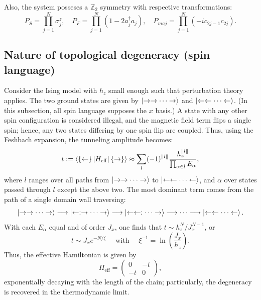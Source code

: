\documentclass{article}
\newcommand{\Heff}{H_{\mathrm{eff}}}
\begin{document}
Also, the system posseses a $\mathbb{Z}_2$ symmetry with respective transformations:
\[
    P_S = \prod_{j=1}^N \sigma_j^z,\quad
    P_F = \prod_{j=1}^N \left( 1 - 2a_j^\dagger a_j \right),\quad
    P_{maj} = \prod_{j=1}^N \left( -ic_{2j-1}c_{2j} \right).
\]

\subsection{Nature of topological degeneracy (spin language)}\label{sec:ising}
Consider the Ising model with $h_z$ small enough such that perturbation theory applies.
The two ground states are given by $\ket{\rightarrow \rightarrow \cdots \rightarrow}$
and $\ket{\leftarrow\leftarrow \cdots \leftarrow}$.
(In this subsection, all spin language supposes the $x$ basis.)
A state with any other spin configuration is considered illegal,
and the magnetic field term flips a single spin;
hence, any two states differing by one spin flip are coupled.
Thus, using the Feshbach expansion, the tunneling amplitude becomes:
\[
    t := \braket{\left\{\leftarrow\right\} | \Heff | \left\{\rightarrow\right\}}
    \approx \sum_{l} (-1)^{\lVert l \rVert} \frac{h_z^{\lVert l\rVert}}{\prod_{\alpha\in l} E_\alpha},
\]
where $l$ ranges over all paths from $\ket{\rightarrow \rightarrow \cdots \rightarrow}$
to $\ket{\leftarrow\leftarrow \cdots \leftarrow}$,
and $\alpha$ over states passed through $l$ except the above two.
The most dominant term comes from the path of a single domain wall traversing:
\[
    \ket{\rightarrow\rightarrow\cdots\rightarrow}
    \longrightarrow \ket{\leftarrow:\rightarrow\cdots\rightarrow}
    \longrightarrow \ket{\leftarrow\leftarrow:\cdots\rightarrow}
    \longrightarrow \cdots
    \longrightarrow \ket{\leftarrow\leftarrow\cdots\leftarrow}.
\]
With each $E_\alpha$ equal and of order $J_x$, one finds that $t \sim h_z^N / J_x^{N-1}$, or
\[
    t \sim J_xe^{-N/\xi}\quad \text{ with }\quad \xi^{-1} = \ln\left( \frac{J_x}{h_z} \right).
\]
Thus, the effective Hamiltonian is given by
\[
    \Heff = \begin{pmatrix}
        0 & -t \\ -t & 0
    \end{pmatrix},
\]
exponentially decaying with the length of the chain;
particularly, the degeneracy is recovered in the thermodynamic limit.
\end{document}
